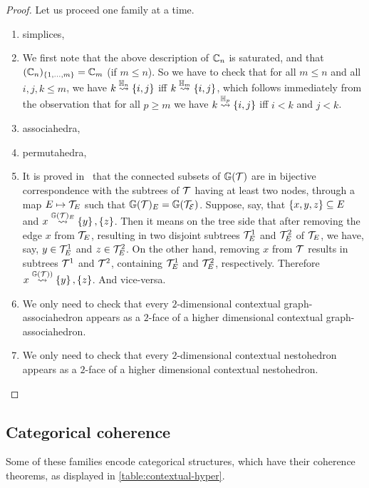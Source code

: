 \begin{proof}
  Let us proceed one family at a time.
  \begin{enumerate}
    \item simplices,
    \item We first note that the above description of ${\mathbb C}_n$ is saturated, and that $({\mathbb C}_n)_{\left\{1,\ldots,m\right\}}={\mathbb C}_m$ (if $m\leq n$).
    So we have to check that  for all $m\leq n$ and all $i,j,k\leq m$, we have $k\stackrel{{{\mathbb H}_n}}{\rightsquigarrow}\left\{i,j\right\}$ iff
    $k\stackrel{{{\mathbb H}_m}}{\rightsquigarrow}\left\{i,j\right\}$, which follows immediately from the observation that for all $p\geq m$ we have
    $k\stackrel{{{\mathbb H}_p}}{\rightsquigarrow}\left\{i,j\right\}$ iff $i<k$ and $j<k$.
    \item associahedra,
    \item permutahedra,
    \item It is proved in~\cite[Lem.~12]{COI} that the connected subsets of ${\mathbb G}({\cal T})$ are in bijective correspondence with the subtrees of $\cal T$ having at least two nodes, through a map $E\mapsto  {\cal T}_E$ such that ${\mathbb G}({\cal T})_E={\mathbb G}({\cal T_E})$. Suppose, say, that $\left\{x,y,z\right\}\subseteq E$ and $x\stackrel{{\mathbb G}({\cal T})_E}{\rightsquigarrow}\left\{y\right\},\left\{z\right\}$. Then it means on the tree side that after removing the edge $x$ from ${\cal T}_E$, resulting in two disjoint subtrees ${\cal T}_E^1$ and ${\cal T}_E^2$ of ${\cal T}_E$, we have, say, $y\in{\cal T}_E^1$ and $z\in{\cal T}_E^2$. 
    On the other hand, removing $x$ from ${\cal T}$ results in subtrees ${\cal T}^1$ and ${\cal T}^2$, containing ${\cal T}_E^1$ and ${\cal T}_E^2$, respectively. 
    Therefore $x\stackrel{{\mathbb G}({\cal T}))}{\rightsquigarrow}\left\{y\right\},\left\{z\right\}$. 
    And vice-versa.
    \item We only need to check that every $2$-dimensional contextual graph-associahedron appears as a $2$-face of a higher dimensional contextual graph-associahedron. 
    \item We only need to check that every $2$-dimensional contextual nestohedron appears as a $2$-face of a higher dimensional contextual nestohedron.
  \end{enumerate}
\end{proof}



\subsection{Categorical coherence}

Some of these families encode categorical structures, which have their coherence theorems, as displayed in \cref{table:contextual-hyper}.

